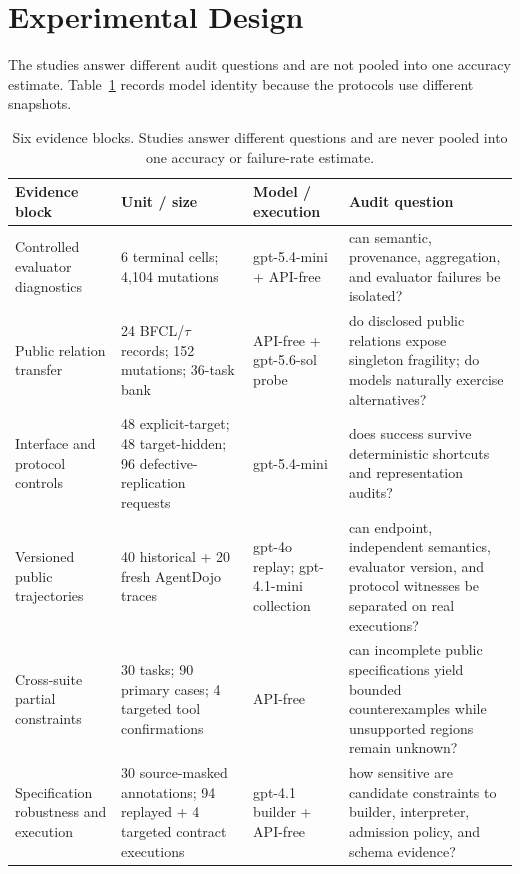 \section{Experimental Design}
\label{sec:design}
The studies answer different audit questions and are not pooled into one accuracy estimate. Table~\ref{tab:studies} records model identity because the protocols use different snapshots.

\begin{table}[t]
\centering
\small
\caption{Six evidence blocks. Studies answer different questions and are never pooled into one accuracy or failure-rate estimate.}
\label{tab:studies}
\begin{tabular}{@{}p{}p{}p{}p{}@{}}
\toprule
Evidence block & Unit / size & Model / execution & Audit question \\
\midrule
Controlled evaluator diagnostics & 6 terminal cells; 4,104 mutations & gpt-5.4-mini + API-free & can semantic, provenance, aggregation, and evaluator failures be isolated? \\
Public relation transfer & 24 BFCL/$\tau$ records; 152 mutations; 36-task bank & API-free + gpt-5.6-sol probe & do disclosed public relations expose singleton fragility; do models naturally exercise alternatives? \\
Interface and protocol controls & 48 explicit-target; 48 target-hidden; 96 defective-replication requests & gpt-5.4-mini & does success survive deterministic shortcuts and representation audits? \\
Versioned public trajectories & 40 historical + 20 fresh AgentDojo traces & gpt-4o replay; gpt-4.1-mini collection & can endpoint, independent semantics, evaluator version, and protocol witnesses be separated on real executions? \\
Cross-suite partial constraints & 30 tasks; 90 primary cases; 4 targeted tool confirmations & API-free & can incomplete public specifications yield bounded counterexamples while unsupported regions remain unknown? \\
Specification robustness and execution & 30 source-masked annotations; 94 replayed + 4 targeted contract executions & gpt-4.1 builder + API-free & how sensitive are candidate constraints to builder, interpreter, admission policy, and schema evidence? \\
\bottomrule
\end{tabular}
\end{table}

